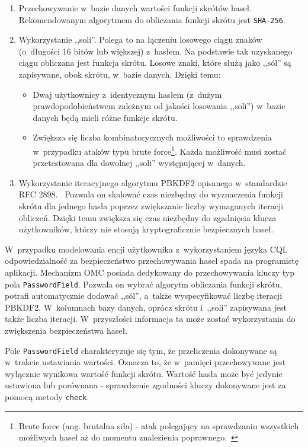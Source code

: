 \begin{enumerate}
	\item Przechowywanie w~bazie danych wartości funkcji skrótów haseł. Rekomendowanym algorytmem do obliczania funkcji skrótu jest \verb+SHA-256+.
	\item Wykorzystanie ,,soli''. Polega to na łączeniu losowego ciągu znaków (o~długości 16 bitów lub większej) z~hasłem. Na podstawie tak uzyskanego ciągu obliczana jest funkcja skrótu. Losowe znaki, które służą jako ,,sól'' są zapisywane, obok skrótu, w~bazie danych. Dzięki temu:
		\begin{itemize}
			\item Dwaj użytkownicy z~identycznym hasłem (z~dużym prawdopodobieństwem zależnym od jakości losowania ,,soli'') w~bazie danych będą mieli różne funkcje skrótu.
			\item Zwiększa się liczba kombinatorycznych możliwości to sprawdzenia w~przypadku ataków typu brute force\footnote{Brute force (ang. brutalna siła) - atak polegający na sprawdzaniu wszystkich możliwych haseł aż do momentu znalezienia poprawnego.~\cite{brute_force_definition}}. Każda możliwość musi zostać przetestowana dla dowolnej ,,soli'' występującej w~danych.
		\end{itemize}
	\item Wykorzystanie iteracyjnego algorytmu PBKDF2 opisanego w~standardzie RFC 2898.~\cite{rfc_2898} Pozwala on skalować czas niezbędny do wyznaczenia funkcji skrótu dla jednego hasła poprzez zwiększanie liczby wymaganych iteracji obliczeń. Dzięki temu zwiększa się czas niezbędny do zgadnięcia klucza użytkowników, którzy nie stosują kryptograficznie bezpiecznych haseł.
\end{enumerate}

W~przypadku modelowania encji użytkownika z~wykorzystaniem języka CQL odpowiedzialność za bezpieczeństwo przechowywania haseł spada na programistę aplikacji. Mechanizm OMC posiada dedykowany do przechowywania kluczy typ pola \verb+PasswordField+. Pozwala on wybrać algorytm obliczania funkcji skrótu, potrafi automatycznie dodawać ,,sól'', a~także wyspecyfikować liczbę iteracji PBKDF2. W~kolumnach bazy danych, oprócz skrótu i~,,soli'' zapisywana jest także liczba iteracji. W~przyszłości informacja ta może zostać wykorzystania do zwiększenia bezpieczeństwa haseł.

Pole \verb+PasswordField+ charakteryzuje się tym, że przeliczenia dokonywane są w~trakcie ustawiania wartości. Oznacza to, że w~pamięci przechowywane jest wyłącznie wynikowa wartość funkcji skrótu. Wartość hasła może być jedynie ustawiona lub porównana - sprawdzenie zgodności kluczy dokonywane jest za pomocą metody \verb+check+.

